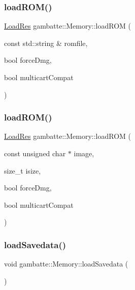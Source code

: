 \subsubsection{\texorpdfstring{load\+R\+O\+M()}{loadROM()}\hspace{0.1cm}{\footnotesize\ttfamily [1/2]}}
{\footnotesize\ttfamily \hyperlink{namespacegambatte_a42606f494711d2e2870a5f5cdf69e468}{Load\+Res} gambatte\+::\+Memory\+::load\+R\+OM (\begin{DoxyParamCaption}\item[{const std\+::string \&}]{romfile,  }\item[{bool}]{force\+Dmg,  }\item[{bool}]{multicart\+Compat }\end{DoxyParamCaption})}

\mbox{\label{classgambatte_1_1Memory_adb1cd8bdc21ebc61b0a7c168aa6f9bf0}} 
\subsubsection{\texorpdfstring{load\+R\+O\+M()}{loadROM()}\hspace{0.1cm}{\footnotesize\ttfamily [2/2]}}
{\footnotesize\ttfamily \hyperlink{namespacegambatte_a42606f494711d2e2870a5f5cdf69e468}{Load\+Res} gambatte\+::\+Memory\+::load\+R\+OM (\begin{DoxyParamCaption}\item[{const unsigned char $\ast$}]{image,  }\item[{size\+\_\+t}]{isize,  }\item[{bool}]{force\+Dmg,  }\item[{bool}]{multicart\+Compat }\end{DoxyParamCaption})}

\mbox{\label{classgambatte_1_1Memory_a48044eb49376c2cd2a71eaacef835c24}} 
\subsubsection{\texorpdfstring{load\+Savedata()}{loadSavedata()}}
{\footnotesize\ttfamily void gambatte\+::\+Memory\+::load\+Savedata (\begin{DoxyParamCaption}{ }\end{DoxyParamCaption})\hspace{0.3cm}{\ttfamily [inline]}}

